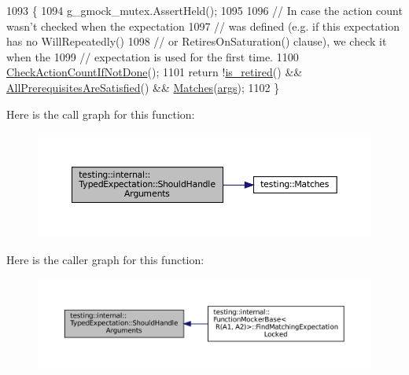 \begin{DoxyCode}
1093                                                     \{
1094     g\_gmock\_mutex.AssertHeld();
1095 
1096     \textcolor{comment}{// In case the action count wasn't checked when the expectation}
1097     \textcolor{comment}{// was defined (e.g. if this expectation has no WillRepeatedly()}
1098     \textcolor{comment}{// or RetiresOnSaturation() clause), we check it when the}
1099     \textcolor{comment}{// expectation is used for the first time.}
1100     \hyperlink{classtesting_1_1internal_1_1ExpectationBase_aaeb143b6f8676e9a6fb9b17678344f03}{CheckActionCountIfNotDone}();
1101     \textcolor{keywordflow}{return} !\hyperlink{classtesting_1_1internal_1_1ExpectationBase_afe539dbc5b29d9635403767a4708c476}{is\_retired}() && \hyperlink{classtesting_1_1internal_1_1ExpectationBase_a82ba68cdd71a8b5aff5a5be24c23a637}{AllPrerequisitesAreSatisfied}() && 
      \hyperlink{classtesting_1_1internal_1_1TypedExpectation_a010336f587859d990b718cd74f13e617}{Matches}(\hyperlink{namespacegenerate__debs_a75f9143e38df82d83b2e8a6f99cae02c}{args});
1102   \}
\end{DoxyCode}
Here is the call graph for this function\+:
\nopagebreak
\begin{figure}[H]
\begin{center}
\leavevmode
\includegraphics[width=350pt]{classtesting_1_1internal_1_1TypedExpectation_a833f473cc3563f566fbfe143682bd05a_cgraph}
\end{center}
\end{figure}
Here is the caller graph for this function\+:
\nopagebreak
\begin{figure}[H]
\begin{center}
\leavevmode
\includegraphics[width=350pt]{classtesting_1_1internal_1_1TypedExpectation_a833f473cc3563f566fbfe143682bd05a_icgraph}
\end{center}
\end{figure}
\mbox{\label{classtesting_1_1internal_1_1TypedExpectation_a9a4c34ee5c6e6adc880a22f61f33da57}} 
